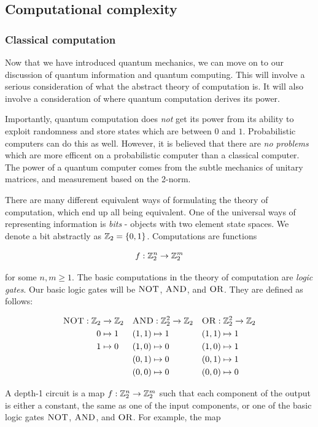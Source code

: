 \documentclass{article}
\theoremstyle{definition}
\numberwithin{figure}{section}
\begin{document}
\subsection{Computational complexity}

\subsubsection{Classical computation}

Now that we have introduced quantum mechanics, we can move on to our discussion of quantum information and quantum computing. This will involve a serious consideration of what the abstract theory of computation is. It will also involve a consideration of where quantum computation derives its power.

Importantly, quantum computation does \textit{not} get its power from its ability to exploit randomness and store states which are between $0$ and $1$. Probabilistic computers can do this as well. However,  it is believed that there are \textit{no problems} which are more efficent on a probabilistic computer than a classical computer. The power of a quantum computer comes from the subtle mechanics of unitary matrices, and measurement based on the 2-norm.

There are many different equivalent ways of formulating the theory of computation, which end up all being equivalent. One of the universal ways of representing information is \textit{bits} - objects with two element state spaces. We denote a bit abstractly as $\mathbb{Z}_2=\{0,1\}$. Computations are functions

$$f:\mathbb{Z}_2^n\to \mathbb{Z}_2^m$$

for some $n,m\geq 1$. The basic computations in the theory of computation are \textit{logic gates}. Our basic logic gates will be $\text{\scshape NOT\normalfont}$, $\text{\scshape AND\normalfont}$, and $\text{\scshape OR\normalfont}$. They are defined as follows:

\begin{align*}
\text{\scshape NOT\normalfont}: \mathbb{Z}_2&\xrightarrow{}\mathbb{Z}_2 && \text{\scshape AND\normalfont}: \mathbb{Z}_2^2\xrightarrow{}\mathbb{Z}_2 && \text{\scshape OR\normalfont}:\mathbb{Z}_2^2\xrightarrow{}\mathbb{Z}_2\\
0&\mapsto 1 && (1,1) \mapsto 1 && (1,1)\mapsto 1\\
1&\mapsto 0 && (1,0)\mapsto 0 && (1,0)\mapsto 1\\
& && (0,1)\mapsto 0 && (0,1)\mapsto 1\\
& && (0,0)\mapsto 0 && (0,0)\mapsto 0\\
\end{align*}

A depth-1 circuit is a map $f:\mathbb{Z}_2^n\to \mathbb{Z}_2^m$ such that each component of the output is either a constant, the same as one of the input components, or one of the basic logic gates $\text{\scshape NOT\normalfont}$, $\text{\scshape AND\normalfont}$, and $\text{\scshape OR\normalfont}$. For example, the map
\end{document}
